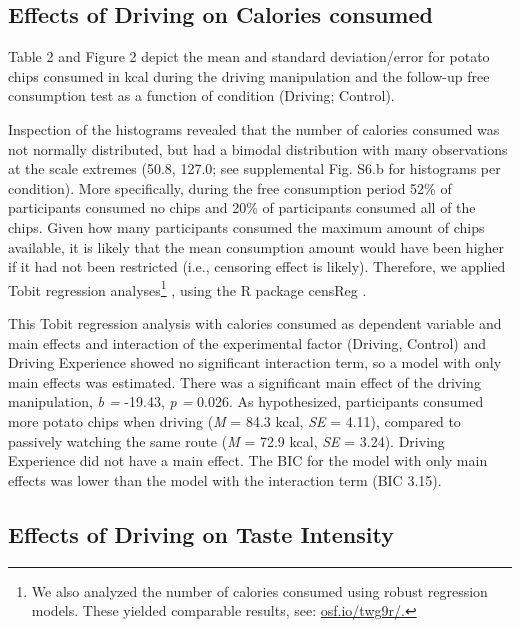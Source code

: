 \documentclass[authordate, empirical]{jote-new-article}
\begin{document}
\subsection{Effects of Driving on Calories consumed }





Table 2 and Figure 2 depict the mean and standard deviation/error for potato chips consumed in kcal during the driving manipulation and the follow-up free consumption test as a function of condition (Driving; Control).


Inspection of the histograms revealed that the number of calories consumed was not normally distributed, but had a bimodal distribution with many observations at the scale extremes (50.8, 127.0; see supplemental Fig. S6.b for histograms per condition). More specifically, during the free consumption period 52\% of participants consumed no chips and 20\% of participants consumed all of the chips. Given how many participants consumed the maximum amount of chips available, it is likely that the mean consumption amount would have been higher if it had not been restricted (i.e., censoring effect is likely). Therefore, we applied Tobit regression analyses\footnote{ We also analyzed the number of calories consumed using robust regression models. These yielded comparable results, see: \url{osf.io/twg9r/.}} \parencites[i.e., censored regression models][]{Tobin1958}, using the R package censReg \parencites{Henningsen2010}.



This Tobit regression analysis with calories consumed as dependent variable and main effects and interaction of the experimental factor (Driving, Control) and Driving Experience showed no significant interaction term, so a model with only main effects was estimated. There was a significant main effect of the driving manipulation, \emph{b = }-19.43, \emph{p = }0.026. As hypothesized, participants consumed more potato chips when driving (\emph{M }= 84.3 kcal, \emph{SE }= 4.11), compared to passively watching the same route (\emph{M }= 72.9 kcal, \emph{SE }= 3.24). Driving Experience did not have a main effect. The BIC for the model with only main effects was lower than the model with the interaction term (BIC 3.15).




\subsection{Effects of Driving on Taste Intensity }
\end{document}
